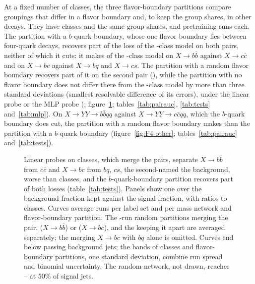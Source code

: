 At a fixed number of classes, the three flavor-boundary partitions compare groupings that differ in a flavor
boundary and, to keep the group shares, in other decays. They have \Kcoarse{} classes and the same group shares, and
\RandFlavRuns{} pretraining runs each. The partition with a $b$-quark boundary, whose one flavor boundary lies between four-quark decays,
recovers part of the loss of the \Kcoarse-class model on both pairs, neither of which it cuts: it makes
\MlstCmpBbFoneOverCoarsePr{} of the \Kcoarse-class model on $X\to b\bar b$ against $X\to c\bar c$ and
\MlstCmpBcFoneOverCoarsePr{} on $X\to bc$ against $X\to bq$ and $X\to cs$. The partition with a random flavor
boundary recovers part of it on the second pair (\MlstCmpBcFonerOverCoarsePr), while the partition with no
flavor boundary does not differ there from the \Kcoarse-class model by more than three standard deviations
(smallest resolvable difference \MlstPwBcFlavZero{} of its errors), under the linear probe or the MLP probe (\MlstMlpCmpBcFzeroOverCoarsePr{}; figure~\ref{fig:F4-mech};
tables~\ref{tab:pairauc}, \ref{tab:tests} and~\ref{tab:mlp}). On $X\to YY\to b\bar bqq$ against $X\to YY\to c\bar cqq$, which the
$b$-quark boundary does cut, the partition with a random flavor boundary makes \MlstCmpBbqqFonerOverFonePr{}
than the partition with a $b$-quark boundary (figure~\ref{fig:F4-other}; tables~\ref{tab:pairauc} and~\ref{tab:tests}).

\begin{figure}[t]
\centering
{}
\caption{Linear probes on \Kcoarse{} classes, which merge the pairs, separate $X\to b\bar b$ from $c\bar c$ and $X\to bc$
from $bq$, $cs$, the second-named the background, worse than \Kfull{} classes, and the $b$-quark-boundary partition recovers
part of both losses (table~\ref{tab:tests}). Panels show one over the background fraction kept against the signal
fraction, with ratios to \Kfull{} classes. Curves average \MlstNRunsWord{} runs per label set and \MlstMassNRunsWord{}
per mass network and flavor-boundary partition. The \RandVtwoRuns-run random partitions merging the pair,
\MlstPairRandMergedBbWord{} ($X\to b\bar b$) or \MlstPairRandMergedBcWord{} ($X\to bc$), and the
\MlstPairRandApartMechWord{} keeping it apart are averaged separately; the \MlstPairRandPartlyBcWord{} merging $X\to bc$
with $bq$ alone is omitted. Curves end below \MlstMinBkgPass{} passing background jets; the bands of \Kfull{} classes and
flavor-boundary partitions, one standard deviation, combine run spread and binomial uncertainty. The random network, not drawn, reaches
\MlstPairInitRhalfMechMin{}--\MlstPairInitRhalfMechMax{} at 50\% of signal jets.}
\label{fig:F4-mech}
\end{figure}

